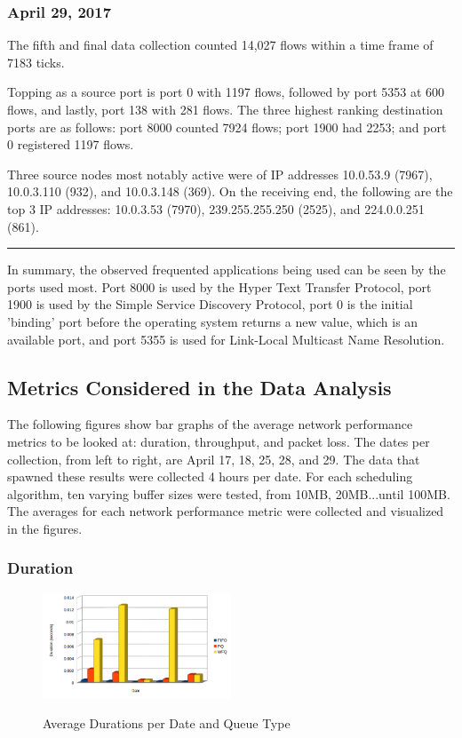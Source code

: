 \documentclass[journal]{IEEE/IEEEtran}
\begin{document}
\subsubsection{\textbf{April 29, 2017}}

The fifth and final data collection counted 14,027 flows within a time frame of 7183 ticks.

Topping as a source port is port 0 with 1197 flows, followed by port 5353 at 600 flows, and lastly, port 138 with 281 flows. The three highest ranking destination ports are as follows: port 8000 counted 7924 flows; port 1900 had 2253; and port 0 registered 1197 flows.

Three source nodes most notably active were of IP addresses 10.0.53.9 (7967), 10.0.3.110 (932), and 10.0.3.148 (369). On the receiving end, the following are the top 3 IP addresses: 10.0.3.53 (7970), 239.255.255.250 (2525), and 224.0.0.251 (861).
\linebreak
\hrule

In summary, the observed frequented applications being used can be seen by the ports used most. Port 8000 is used by the Hyper Text Transfer Protocol, port 1900 is used by the Simple Service Discovery Protocol, port 0 is the initial 'binding' port before the operating system returns a new value, which is an available port, and port 5355 is used for Link-Local Multicast Name Resolution.

\subsection{Metrics Considered in the Data Analysis}
The following figures show bar graphs of the average network performance metrics to be looked at: duration, throughput, and packet loss. The dates per collection, from left to right, are April 17, 18, 25, 28, and 29. The data that spawned these results were collected 4 hours per date. For each scheduling algorithm, ten varying buffer sizes were tested, from 10MB, 20MB...until 100MB. The averages for each network performance metric were collected and visualized in the figures.

\subsubsection{Duration}

\begin{figure}
\includegraphics[width=0.5\textwidth]{duration}
\label{fig:duration}\caption{Average Durations per Date and Queue Type}
\end{figure}
\end{document}
